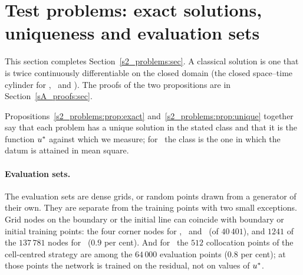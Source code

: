 \section{Test problems: exact solutions, uniqueness and evaluation sets}\label{S1:sec}

This section completes Section~\ref{s2_problems:sec}. A classical solution is one that is
twice continuously differentiable on the closed domain (the closed space--time cylinder for
\PH, \PWone\ and \PWtwo). The proofs of the two propositions are in
Section~\ref{sA_proofs:sec}.

\begin{proposition}\label{s2_problems:prop:exact}\leavevmode
\StmtExact
\end{proposition}

\begin{proposition}[Uniqueness]\label{s2_problems:prop:unique}\leavevmode
\StmtUnique
\end{proposition}

Propositions~\ref{s2_problems:prop:exact} and~\ref{s2_problems:prop:unique} together say that
each problem has a unique solution in the stated class and that it is the function $u^{*}$
against which we measure; for \PLthree\ the class is the one in which the datum is attained
in mean square.

\paragraph{Evaluation sets.}
The evaluation sets are dense grids, or random points drawn from a generator of their own.
They are separate from the training points with two small exceptions. Grid nodes on the
boundary or the initial line can coincide with boundary or initial training points: the four
corner nodes for \PH, \PWone\ and \PLtwo\ (of $40\,401$), and $1241$ of the $137\,781$ nodes
for \PWtwo\ ($0.9$ per cent). And for \PLthree\ the $512$ collocation points of the
cell-centred strategy  are among the $64\,000$ evaluation points ($0.8$ per
cent); at those points the network is trained on the residual, not on values of $u^{*}$.

